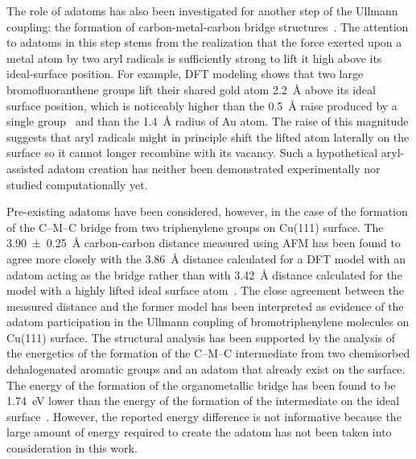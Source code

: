 \documentclass[journal=jacsat,manuscript=article]{achemso}
\newcommand{\lock}{\color{red}}
\newcommand{\lock}{\color{black}}
\newcommand{\comm}{\color{ForestGreen}} %
\begin{document}
{\lock 

The role of adatoms has also been investigated for another step of the Ullmann coupling: the formation of carbon-metal-carbon bridge structures~\cite{acsnano2017, acsnano2019}. %
The attention to adatoms in this step stems from the realization that the force exerted upon a metal atom by two aryl radicals is sufficiently strong to lift it high above its ideal-surface position. 
For example, DFT modeling shows that two large bromofluoranthene groups lift their shared gold atom \SI{2.2}{\angstrom} above its ideal surface position, which is noticeably higher than the \SI{0.5}{\angstrom} raise produced by a single group~\cite{jpcc2018} and than the \SI{1.4}{\angstrom} radius of Au atom.
The raise of this magnitude suggests that aryl radicals might in principle shift the lifted atom laterally on the surface so it cannot longer recombine with its vacancy. Such a hypothetical aryl-assisted adatom creation has neither been demonstrated experimentally nor studied computationally yet.

Pre-existing adatoms have been considered, however, in the case of the formation of the C--M--C bridge from two triphenylene groups on Cu(111) surface. 
The \SI{3.90\pm 0.25}{\angstrom} carbon-carbon distance measured using AFM has been found to agree more closely with the \SI{3.86}{\angstrom} distance calculated for a DFT model with an adatom acting as the bridge rather than with \SI{3.42}{\angstrom} distance calculated for the model with a highly lifted ideal surface atom~\cite{acsnano2017}. 
The close agreement between the measured distance and the former model has been interpreted as evidence of the adatom participation in the Ullmann coupling of bromotriphenylene molecules on Cu(111) surface. 
%
The structural analysis has been supported by the analysis of the energetics of the formation of the C--M--C intermediate from two chemisorbed dehalogenated aromatic groups and an adatom that already exist on the surface. The energy of the formation of the organometallic bridge has been found to be \SI{1.74}{\electronvolt} lower than the energy of the formation of the intermediate on the ideal surface~\cite{acsnano2017}. However, the reported energy difference is not informative because the large amount of energy required to create the adatom has not been taken into consideration in this work.

}
\end{document}
